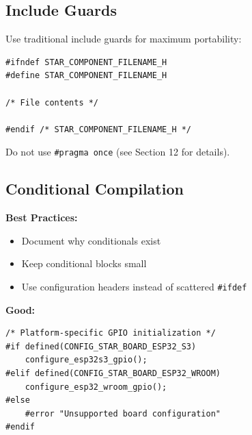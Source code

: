 \subsection{Include Guards}

Use traditional include guards for maximum portability:

\begin{verbatim}
#ifndef STAR_COMPONENT_FILENAME_H
#define STAR_COMPONENT_FILENAME_H

/* File contents */

#endif /* STAR_COMPONENT_FILENAME_H */
\end{verbatim}

Do not use \texttt{\#pragma once} (see Section 12 for details).

\subsection{Conditional Compilation}

\textbf{Best Practices:}
\begin{itemize}
    \item Document why conditionals exist
    \item Keep conditional blocks small
    \item Use configuration headers instead of scattered \texttt{\#ifdef}
\end{itemize}

\textbf{Good:}
\begin{verbatim}
/* Platform-specific GPIO initialization */
#if defined(CONFIG_STAR_BOARD_ESP32_S3)
    configure_esp32s3_gpio();
#elif defined(CONFIG_STAR_BOARD_ESP32_WROOM)
    configure_esp32_wroom_gpio();
#else
    #error "Unsupported board configuration"
#endif
\end{verbatim}
